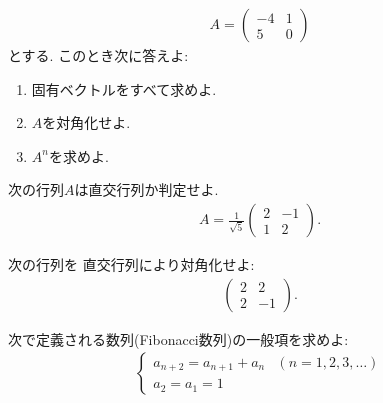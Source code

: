 \begin{quiz}
  \label{quiz:6:4}
  \begin{align*}
    A=\begin{pmatrix}-4&1\\5&0\end{pmatrix}
  \end{align*}
  とする.
  このとき次に答えよ:
  \begin{enumerate}
  \item 固有ベクトルをすべて求めよ.
  \item $A$を対角化せよ.
  \item $A^n$を求めよ.
  \end{enumerate}
\end{quiz}

\begin{quiz}
  \label{quiz:6:5}
  次の行列$A$は直交行列か判定せよ. 
  \begin{align*}
   A=\frac{1}{\sqrt{5}}
    \begin{pmatrix}
      2&-1\\
      1&2
    \end{pmatrix}.
  \end{align*}
\end{quiz}

\begin{quiz}
  \label{quiz:6:6}
  次の行列を
  直交行列により対角化せよ:
  \begin{align*}
    \begin{pmatrix}
      2&2\\2&-1
    \end{pmatrix}.
  \end{align*}
\end{quiz}


\begin{quiz}
  次で定義される数列(Fibonacci数列)の一般項を求めよ:
  \begin{align*}
    \begin{cases}
      a_{n+2}=a_{n+1}+a_n&(n=1,2,3,\ldots)\\
      a_{2}=a_{1}=1
    \end{cases}
  \end{align*}
\end{quiz}

